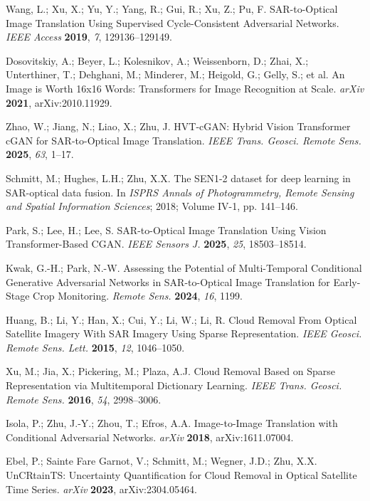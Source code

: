 Wang, L.; Xu, X.; Yu, Y.; Yang, R.; Gui, R.; Xu, Z.; Pu, F. SAR-to-Optical Image Translation Using Supervised Cycle-Consistent Adversarial Networks. {\em IEEE Access} {\bf 2019}, {\em 7}, 129136--129149.

Dosovitskiy, A.; Beyer, L.; Kolesnikov, A.; Weissenborn, D.; Zhai, X.; Unterthiner, T.; Dehghani, M.; Minderer, M.; Heigold, G.; Gelly, S.; et al. An Image is Worth 16x16 Words: Transformers for Image Recognition at Scale. {\em arXiv} {\bf 2021}, arXiv:2010.11929.

Zhao, W.; Jiang, N.; Liao, X.; Zhu, J. HVT-cGAN: Hybrid Vision Transformer cGAN for SAR-to-Optical Image Translation. {\em IEEE Trans. Geosci. Remote Sens.} {\bf 2025}, {\em 63}, 1--17.

Schmitt, M.; Hughes, L.H.; Zhu, X.X. The SEN1-2 dataset for deep learning in SAR-optical data fusion. In {\em ISPRS Annals of Photogrammetry, Remote Sensing and Spatial Information Sciences}; 2018; Volume IV-1, pp. 141--146.

Park, S.; Lee, H.; Lee, S. SAR-to-Optical Image Translation Using Vision Transformer-Based CGAN. {\em IEEE Sensors J.} {\bf 2025}, {\em 25}, 18503--18514.

Kwak, G.-H.; Park, N.-W. Assessing the Potential of Multi-Temporal Conditional Generative Adversarial Networks in SAR-to-Optical Image Translation for Early-Stage Crop Monitoring. {\em Remote Sens.} {\bf 2024}, {\em 16}, 1199.

Huang, B.; Li, Y.; Han, X.; Cui, Y.; Li, W.; Li, R. Cloud Removal From Optical Satellite Imagery With SAR Imagery Using Sparse Representation. {\em IEEE Geosci. Remote Sens. Lett.} {\bf 2015}, {\em 12}, 1046--1050.

Xu, M.; Jia, X.; Pickering, M.; Plaza, A.J. Cloud Removal Based on Sparse Representation via Multitemporal Dictionary Learning. {\em IEEE Trans. Geosci. Remote Sens.} {\bf 2016}, {\em 54}, 2998--3006.

Isola, P.; Zhu, J.-Y.; Zhou, T.; Efros, A.A. Image-to-Image Translation with Conditional Adversarial Networks. {\em arXiv} {\bf 2018}, arXiv:1611.07004.

Ebel, P.; Sainte Fare Garnot, V.; Schmitt, M.; Wegner, J.D.; Zhu, X.X. UnCRtainTS: Uncertainty Quantification for Cloud Removal in Optical Satellite Time Series. {\em arXiv} {\bf 2023}, arXiv:2304.05464.

